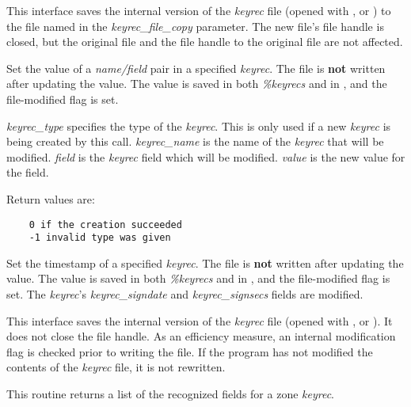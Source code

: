 \begin{description}
This interface saves the internal version of the {\it keyrec} file (opened
with ,  or )
to the file named in the {\it keyrec\_file\_copy} parameter.  The new file's
file handle is closed, but the original file and the file handle to the
original file are not affected.

\item {}

Set the value of a {\it name/field} pair in a specified {\it keyrec}.  The
file is {\bf not} written after updating the value.  The value is saved in
both {\it \%keyrecs} and in {\it \@keyreclines}, and the file-modified flag
is set.

{\it keyrec\_type} specifies the type of the {\it keyrec}.  This is only used
if a new {\it keyrec} is being created by this call.  {\it keyrec\_name} is
the name of the {\it keyrec} that will be modified.  {\it field} is the {\it
keyrec} field which will be modified.  {\it value} is the new value for the
field.

Return values are:

\begin{verbatim}
    0 if the creation succeeded
    -1 invalid type was given
\end{verbatim}

\item {}

Set the timestamp of a specified {\it keyrec}.  The file is {\bf not} written
after updating the value.  The value is saved in both {\it \%keyrecs} and in
{\it \@keyreclines}, and the file-modified flag is set.  The {\it keyrec}'s
{\it keyrec\_signdate} and {\it keyrec\_signsecs} fields are modified.

\item {}

This interface saves the internal version of the {\it keyrec} file (opened
with ,  or ).
It does not close the file handle.  As an efficiency measure, an internal
modification flag is checked prior to writing the file.  If the program has
not modified the contents of the {\it keyrec} file, it is not rewritten.

\item {}

This routine returns a list of the recognized fields for a zone {\it keyrec}.

\end{description}

